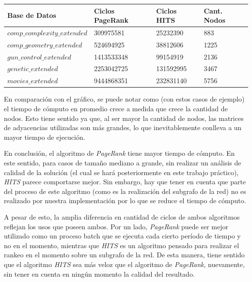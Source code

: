 \begin{center}
    \begin{tabular}{| l | l | l | l |}
    \hline
    Base de Datos & Ciclos PageRank & Ciclos HITS & Cant. Nodos \\ \hline
    $comp\_complexity\_extended$ & 309975581 & 25232390 & 883 \\ \hline
    $comp\_geometry\_extended$ & 524694925 & 38812606 & 1225 \\ \hline
	$gun\_control\_extended$ & 1413533348 & 99154919 & 2136 \\ \hline
	$genetic\_extended$ & 2253042725 & 131592995 & 3467 \\ \hline
	$movies\_extended$ & 9444868351 & 232831140	& 5756 \\ \hline
    \end{tabular}
\end{center}

En comparación con el gráfico, se puede notar como (con estos casos de ejemplo) el tiempo de cómputo en promedio crece a medida que crece la cantidad de nodos. Esto tiene sentido ya que, al ser mayor la cantidad de nodos, las matrices de adyacencias utilizadas son más grandes, lo que inevitablemente conlleva a un mayor tiempo de ejecución.

\par 

En conclusión, el algoritmo de \textit{PageRank} tiene mayor tiempo de cómputo. En este sentido, para casos de tamaño mediano a grande, sin realizar un análisis de calidad de la solución (el cual se hará posteriormente en este trabajo práctico), \textit{HITS} parece comportarse mejor. Sin embargo, hay que tener en cuenta que parte del proceso de este algoritmo (como es la realización del subgrafo de la red) no es realizado por nuestra implementación por lo que se reduce el tiempo de cómputo. 
\par A pesar de esto, la amplia diferencia en cantidad de ciclos de ambos algoritmos reflejan los usos que poseen ambos. Por un lado, \textit{PageRank} puede ser mejor utilizado como un proceso batch que se ejecuta cada cierto período de tiempo y no en el momento, mientras que \textit{HITS} es un algoritmo pensado para realizar el rankeo en el momento sobre un subgrafo de la red. De esta manera, tiene sentido que el algoritmo \textit{HITS} sea más veloz que el algoritmo de \textit{PageRank}, nuevamente, sin tener en cuenta en ningún momento la calidad del resultado.



